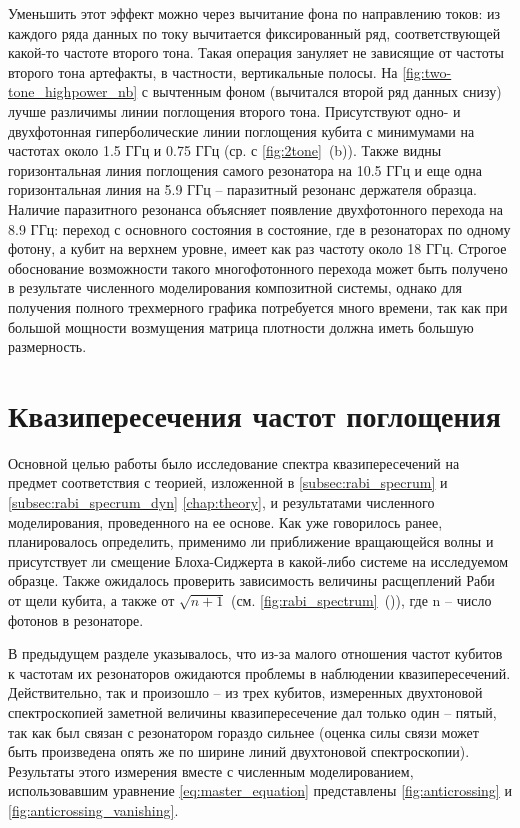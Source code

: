 \documentclass[12pt, twoside]{report}
\numberwithin{equation}{section}
\numberwithin{figure}{section}
\begin{document}
Уменьшить этот эффект можно через вычитание фона по направлению токов: из каждого ряда данных по току вычитается фиксированный ряд, соответствующей какой-то частоте второго тона. Такая операция зануляет не зависящие от частоты второго тона артефакты, в частности, вертикальные полосы. На \autoref{fig:two-tone_highpower_nb} с вычтенным фоном (вычитался второй ряд данных снизу) лучше различимы линии поглощения второго тона. Присутствуют одно- и двухфотонная гиперболические линии поглощения кубита с минимумами на частотах около 1.5 ГГц и 0.75 ГГц (ср. с \autoref{fig:2tone}~(b)). Также видны горизонтальная линия поглощения самого резонатора на 10.5 ГГц и еще одна горизонтальная линия на 5.9 ГГц -- паразитный резонанс держателя образца. Наличие паразитного резонанса объясняет появление двухфотонного перехода на 8.9 ГГц: переход с основного состояния в состояние, где в резонаторах по одному фотону, а кубит на верхнем уровне, имеет как раз частоту около 18 ГГц. Строгое обоснование возможности такого многофотонного перехода может быть получено в результате численного моделирования композитной системы, однако для получения полного трехмерного графика потребуется много времени, так как при большой мощности возмущения матрица плотности должна иметь большую размерность.


\section{Квазипересечения частот поглощения}

Основной целью работы было исследование спектра квазипересечений на предмет соответствия с теорией, изложенной в \autoref{subsec:rabi_specrum} и \autoref{subsec:rabi_specrum_dyn} \autoref{chap:theory}, и результатами численного моделирования, проведенного на ее основе. Как уже говорилось ранее, планировалось определить, применимо ли приближение вращающейся волны и присутствует ли смещение Блоха-Сиджерта в какой-либо системе на исследуемом образце. Также ожидалось проверить зависимость величины расщеплений Раби от щели кубита, а также от $\sqrt{n+1}$ (см. \autoref{fig:rabi_spectrum}~()), где n -- число фотонов в резонаторе\cite{bishop2009}.

В предыдущем разделе указывалось, что из-за малого отношения частот кубитов к частотам их резонаторов ожидаются проблемы в наблюдении квазипересечений. Действительно, так и произошло -- из трех кубитов, измеренных двухтоновой спектроскопией заметной величины квазипересечение дал только один -- пятый, так как был связан с резонатором гораздо сильнее (оценка силы связи может быть произведена опять же по ширине линий двухтоновой спектроскопии). Результаты этого измерения вместе с численным моделированием, использовавшим уравнение \eqref{eq:master_equation} представлены \autoref{fig:anticrossing} и \autoref{fig:anticrossing_vanishing}.
\end{document}
